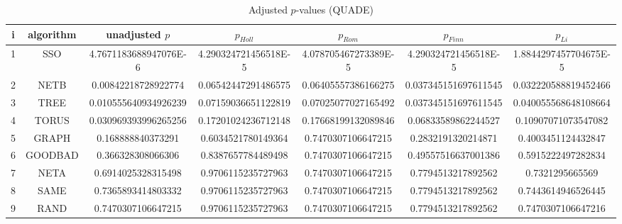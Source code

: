 \documentclass[a4paper,10pt]{article}
\begin{document}
\begin{landscape}
\begin{table}[!htp]
\centering\scriptsize
\caption{Adjusted $p$-values (QUADE)}
\begin{tabular}{ccccccc}
i&algorithm&unadjusted $p$&$p_{Holl}$&$p_{Rom}$&$p_{Finn}$&$p_{Li}$\\
\hline
1& SSO&4.7671183688947076E-6&4.290324721456518E-5&4.078705467273389E-5&4.290324721456518E-5&1.8844297457704675E-5\\
2& NETB&0.00842218728922774&0.06542447291486575&0.06405557386166275&0.037345151697611545&0.032220588819452466\\
3& TREE&0.010555640934926239&0.07159036651122819&0.07025077027165492&0.037345151697611545&0.040055568648108664\\
4& TORUS&0.030969393996265256&0.17201024236712148&0.17668199132089846&0.06833589862244527&0.10907071073547082\\
5& GRAPH&0.168888840373291&0.6034521780149364&0.7470307106647215&0.2832191320214871&0.4003451124432847\\
6& GOODBAD&0.366328308066306&0.8387657784489498&0.7470307106647215&0.49557516637001386&0.5915222497282834\\
7& NETA&0.6914025328315498&0.9706115235727963&0.7470307106647215&0.7794513217892562&0.7321295665569\\
8& SAME&0.7365893414803332&0.9706115235727963&0.7470307106647215&0.7794513217892562&0.7443614946526445\\
9& RAND&0.7470307106647215&0.9706115235727963&0.7470307106647215&0.7794513217892562&0.7470307106647216\\
\hline
\end{tabular}
\end{table}

\end{landscape}
\end{document}
